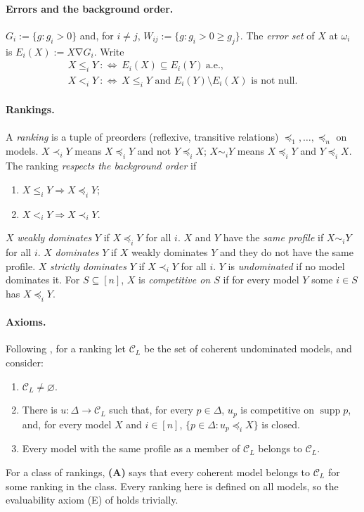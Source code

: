 \documentclass[11pt]{article}
\theoremstyle{definition}
\newcommand{\supp}{\operatorname{supp}}
\newcommand{\sd}{\mathbin{\nabla}}
\newcommand{\aev}{\ \text{a.e.}}
\begin{document}
\paragraph{Errors and the background order.}
$G_i:=\{g:g_i>0\}$ and, for $i\ne j$, $W_{ij}:=\{g:g_i>0\ge g_j\}$. The \emph{error set} of $X$ at $\omega_i$ is $E_i(X):=X\sd G_i$. Write
\begin{gather*}
X\le_iY\ :\iff\ E_i(X)\subseteq E_i(Y)\aev,\\
X<_iY\ :\iff\ X\le_iY\text{ and }E_i(Y)\setminus E_i(X)\text{ is not null}.
\end{gather*}

\paragraph{Rankings.}
A \emph{ranking} is a tuple of preorders (reflexive, transitive relations) $\preceq_1,\dots,\preceq_n$ on models. $X\prec_iY$ means $X\preceq_iY$ and not $Y\preceq_iX$; $X\sim_iY$ means $X\preceq_iY$ and $Y\preceq_iX$. The ranking \emph{respects the background order} if
\begin{enumerate}[label=(B\arabic*),itemsep=0pt]
\item $X\le_iY\Rightarrow X\preceq_iY$;
\item $X<_iY\Rightarrow X\prec_iY$.
\end{enumerate}
$X$ \emph{weakly dominates} $Y$ if $X\preceq_iY$ for all $i$. $X$ and $Y$ have the \emph{same profile} if $X\sim_iY$ for all $i$. $X$ \emph{dominates} $Y$ if $X$ weakly dominates $Y$ and they do not have the same profile. $X$ \emph{strictly dominates} $Y$ if $X\prec_iY$ for all $i$. $Y$ is \emph{undominated} if no model dominates it. For $S\subseteq[n]$, $X$ is \emph{competitive on $S$} if for every model $Y$ some $i\in S$ has $X\preceq_iY$.

\paragraph{Axioms.}
Following \cite{KCM}, for a ranking let $\mathcal C_L$ be the set of coherent undominated models, and consider:
\begin{enumerate}[itemsep=0pt]
\item[\textbf{(LA)}] $\mathcal C_L\ne\varnothing$.
\item[\textbf{(S)}] There is $u:\Delta\to\mathcal C_L$ such that, for every $p\in\Delta$, $u_p$ is competitive on $\supp p$, and, for every model $X$ and $i\in[n]$, $\{p\in\Delta:u_p\preceq_iX\}$ is closed.
\item[\textbf{(C)}] Every model with the same profile as a member of $\mathcal C_L$ belongs to $\mathcal C_L$.
\end{enumerate}
For a class of rankings, \textbf{(A)} says that every coherent model belongs to $\mathcal C_L$ for some ranking in the class. Every ranking here is defined on all models, so the evaluability axiom (E) of \cite{KCM} holds trivially.
\end{document}

